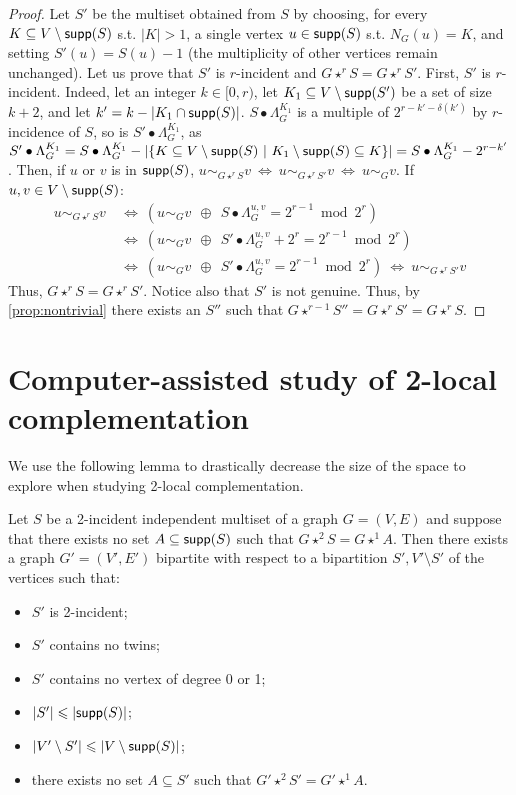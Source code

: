 \documentclass[a4paper,UKenglish,cleveref,autoref,thm-restate]{arxiv}
\newcommand{\se}{\subseteq}
\newcommand{\ls}{\leqslant}
\newcommand{\sm}{\setminus}
\newcommand{\supp}{\textup{\textsf{supp}}}
\begin{document}
\begin{proof}
    Let $S'$ be the multiset obtained from $S$ by choosing, for every $K \se V \sm \supp(S)$ s.t. $|K|>1$, a single vertex $u \in \supp(S)$ s.t. $N_{G}(u)=K$, and setting $S'(u)=S(u)-1$ (the multiplicity of other vertices remain unchanged). Let us prove that $S'$ is $r$-incident and $G \star^r S = G\star^{r} S'$. First, $S'$ is $r$-incident. Indeed, let an integer $k\in [0,r)$, let $K_1\subseteq V\setminus \supp(S')$ be a set of size $k+2$, and let $k'=k-|K_1\cap \supp(S)|$. $S\bullet \Lambda_G^{K_1}$ is a multiple of $2^{r-k'-\delta(k')}$ by $r$-incidence of $S$, so is $S'\bullet \Lambda_G^{K_1}$, as $S'\bullet \Lambda_G^{K_1} = S\bullet \Lambda_G^{K_1} -|\{K \se V \sm \supp(S)~|~K_1\sm \supp(S)\se K\}| = S\bullet \Lambda_G^{K_1} -2^{r-k'}$. Then, if $u$ or $v$ is in $\supp(S)$, $u\sim_{G\star^r S} v ~\Leftrightarrow~ u\sim_{G\star^{r} S'} v ~\Leftrightarrow~ u\sim_{G} v$. If $u,v \in V \sm \supp(S)$:
    \begin{align*}
        u\sim_{G\star^r S} v &~\Leftrightarrow~\left(u\sim_{G} v ~~\oplus~~ S \bullet\Lambda_G^{u,v} = 2^{r-1}\bmod 2^{r}\right)\\
        &~\Leftrightarrow~\left(u\sim_{G} v ~~\oplus~~ S'\bullet \Lambda_G^{u,v} +2^{r} = 2^{r-1}\bmod 2^{r}\right)\\
        &~\Leftrightarrow~\left(u\sim_{G} v ~~\oplus~~ S'\bullet \Lambda_G^{u,v} = 2^{r-1}\bmod 2^{r}\right)
        ~\Leftrightarrow~ u\sim_{G\star^{r}S'} v
    \end{align*}
    Thus, $G\star^r S = G\star^r S'$. Notice also that $S'$ is not genuine. Thus, by \cref{prop:nontrivial} there exists an $S''$ such that $G\star^{r-1} S'' = G \star^r S' = G \star^r S$.
\end{proof}

\section{Computer-assisted study of 2-local complementation}
\label{app:computer}

We use the following lemma to drastically decrease the size of the space to explore when studying 2-local complementation.

\begin{lemma} \label{lemma:lifting}
    Let $S$ be a 2-incident independent multiset of a graph $G=(V,E)$ and suppose that there exists no set $A \se \supp(S)$ such that $G \star^2 S = G \star^1 A$. Then there exists a graph $G'=(V',E')$ bipartite with respect to a bipartition $S', V' \sm S'$ of the vertices such that:
    \begin{itemize}
        \item $S'$ is 2-incident;
        \item $S'$ contains no twins;
        \item $S'$ contains no vertex of degree 0 or 1;
        \item $|S'| \ls |\supp(S)|$;
        \item $|V' \sm S'|\ls |V \sm \supp(S)|$;
        \item there exists no set $A \se S'$ such that $G' \star^2 S' = G' \star^1 A$.
    \end{itemize}
\end{lemma}
\end{document}
